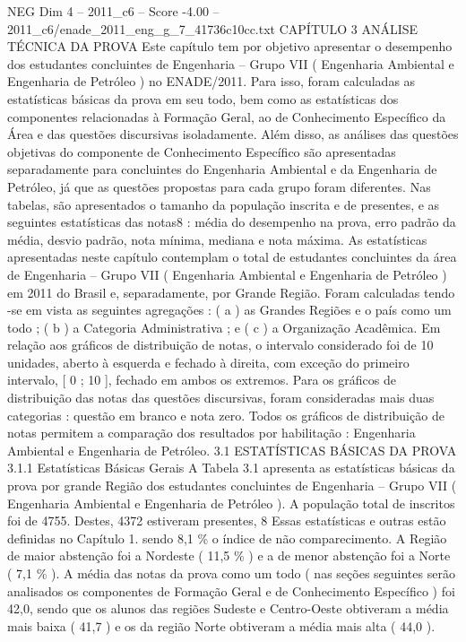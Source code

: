\begin{textsample}{NEG Dim 4 – 2011\_c6 – Score -4.00 – 2011\_c6/enade\_2011\_eng\_g\_7\_41736c10cc.txt}  \label{ex:f4_neg_051}
CAPÍTULO 3 ANÁLISE TÉCNICA DA PROVA Este capítulo tem por objetivo apresentar o desempenho dos estudantes concluintes de Engenharia – Grupo VII ( Engenharia Ambiental e Engenharia de Petróleo ) no ENADE/2011.
Para isso, foram calculadas as estatísticas básicas da prova em seu todo, bem como as estatísticas dos componentes relacionadas à Formação Geral, ao de Conhecimento Específico da Área e das questões discursivas isoladamente.
Além disso, as análises das questões objetivas do componente de Conhecimento Específico são apresentadas separadamente para concluintes do Engenharia Ambiental e da Engenharia de Petróleo, já que as questões propostas para cada grupo foram diferentes.
Nas tabelas, são apresentados o tamanho da população inscrita e de presentes, e as seguintes estatísticas das notas8 : média do desempenho na prova, erro padrão da média, desvio padrão, nota mínima, mediana e nota máxima.
As estatísticas apresentadas neste capítulo contemplam o total de estudantes concluintes da área de Engenharia – Grupo VII ( Engenharia Ambiental e Engenharia de Petróleo ) em 2011 do Brasil e, separadamente, por Grande Região.
Foram calculadas tendo -se em vista as seguintes agregações : ( a ) as Grandes Regiões e o país como um todo ; ( b ) a Categoria Administrativa ; e ( c ) a Organização Acadêmica.
Em relação aos gráficos de distribuição de notas, o intervalo considerado foi de 10 unidades, aberto à esquerda e fechado à direita, com exceção do primeiro intervalo, [ 0 ; 10 ], fechado em ambos os extremos.
Para os gráficos de distribuição das notas das questões discursivas, foram consideradas mais duas categorias : questão em branco e nota zero.
Todos os gráficos de distribuição de notas permitem a comparação dos resultados por habilitação : Engenharia Ambiental e Engenharia de Petróleo. 3.1 ESTATÍSTICAS BÁSICAS DA PROVA 3.1.1 Estatísticas Básicas Gerais A Tabela 3.1 apresenta as estatísticas básicas da prova por grande Região dos estudantes concluintes de Engenharia – Grupo VII ( Engenharia Ambiental e Engenharia de Petróleo ).
A população total de inscritos foi de 4755.
Destes, 4372 estiveram presentes, 8 Essas estatísticas e outras estão definidas no Capítulo 1. sendo 8,1 \% o índice de não comparecimento.
A Região de maior abstenção foi a Nordeste ( 11,5 \% ) e a de menor abstenção foi a Norte ( 7,1 \% ).
A média das notas da prova como um todo ( nas seções seguintes serão analisados os componentes de Formação Geral e de Conhecimento Específico ) foi 42,0, sendo que os alunos das regiões Sudeste e Centro-Oeste obtiveram a média mais baixa ( 41,7 ) e os da região Norte obtiveram a média mais alta ( 44,0 ).

\end{textsample}
